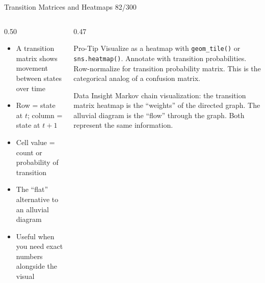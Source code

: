 \documentclass[10pt]{beamer}
\newcommand{\smark}[1]{\hfill{\scriptsize\color{codegray}#1}}
\begin{document}
\begin{frame}{Transition Matrices and Heatmaps}
\smark{82/300}
\begin{columns}[T]
\begin{column}{0.50\textwidth}
\begin{itemize}
    \item A transition matrix shows movement between states over time
    \item Row = state at $t$; column = state at $t+1$
    \item Cell value = count or probability of transition
    \item The ``flat'' alternative to an alluvial diagram
    \item Useful when you need exact numbers alongside the visual
\end{itemize}
\end{column}
\begin{column}{0.47\textwidth}
\begin{alertblock}{Pro-Tip}
    \scriptsize Visualize as a heatmap with \texttt{geom\_tile()} or \texttt{sns.heatmap()}. Annotate with transition probabilities. Row-normalize for transition probability matrix. This is the categorical analog of a confusion matrix.
\end{alertblock}
\vspace{0.1cm}
\begin{exampleblock}{Data Insight}
    \scriptsize Markov chain visualization: the transition matrix heatmap is the ``weights'' of the directed graph. The alluvial diagram is the ``flow'' through the graph. Both represent the same information.
\end{exampleblock}
\end{column}
\end{columns}
\end{frame}
\end{document}
